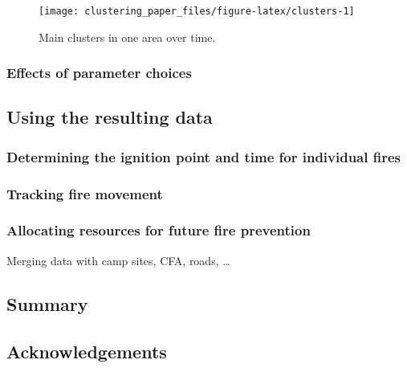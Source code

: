 \begin{Schunk}
\begin{figure}
\texttt{[image: clustering\_paper\_files/figure-latex/clusters-1]} \caption[Main clusters in one area over time]{Main clusters in one area over time.}\label{fig:clusters}
\end{figure}
\end{Schunk}

\hypertarget{effects-of-parameter-choices}{%
\subsubsection{Effects of parameter
choices}\label{effects-of-parameter-choices}}

\hypertarget{using-the-resulting-data}{%
\subsection{Using the resulting data}\label{using-the-resulting-data}}

\hypertarget{determining-the-ignition-point-and-time-for-individual-fires}{%
\subsubsection{Determining the ignition point and time for individual
fires}\label{determining-the-ignition-point-and-time-for-individual-fires}}

\hypertarget{tracking-fire-movement}{%
\subsubsection{Tracking fire movement}\label{tracking-fire-movement}}

\hypertarget{allocating-resources-for-future-fire-prevention}{%
\subsubsection{Allocating resources for future fire
prevention}\label{allocating-resources-for-future-fire-prevention}}

Merging data with camp sites, CFA, roads, \ldots{}

\hypertarget{summary}{%
\subsection{Summary}\label{summary}}

\hypertarget{acknowledgements}{%
\subsection{Acknowledgements}\label{acknowledgements}}

